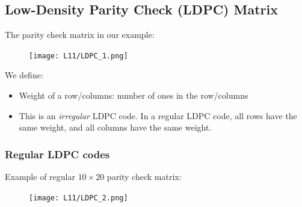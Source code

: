 \documentclass[12pt]{article}
\begin{document}
\subsection{Low-Density Parity Check (LDPC) Matrix}
 The parity check matrix in our example: 
 \begin{figure}[H]
    \centering
    \texttt{[image: L11/LDPC\_1.png]}
\end{figure}
We define:
\begin{itemize}
    \item Weight of a row/columns: number of ones in the row/columns
    \item This is an \textit{irregular} LDPC code. In a regular LDPC code, all rows have the same weight, and all columns have the same weight.
\end{itemize}
\subsubsection{Regular LDPC codes}
Example of regular $10 \times 20 $ parity check matrix:
\begin{figure}[H]
    \centering
    \texttt{[image: L11/LDPC\_2.png]}
\end{figure}
\end{document}
